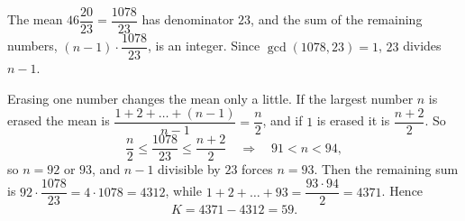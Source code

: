 The mean $46\dfrac{20}{23}=\dfrac{1078}{23}$ has denominator $23$, and the sum of the remaining numbers, $(n-1)\cdot\dfrac{1078}{23}$, is an integer. Since $\gcd(1078,23)=1$, $23$ divides $n-1$.

Erasing one number changes the mean only a little. If the largest number $n$ is erased the mean is $\dfrac{1+2+\dots+(n-1)}{n-1}=\dfrac {n}{2}$, and if $1$ is erased it is $\dfrac{n+2}{2}$. So
\[
\dfrac {n}{2}\le\dfrac{1078}{23}\le\dfrac{n+2}{2}\quad\Longrightarrow\quad 91<n<94,
\]
so $n=92$ or $93$, and $n-1$ divisible by $23$ forces $n=93$. Then the remaining sum is $92\cdot\dfrac{1078}{23}=4\cdot1078=4312$, while $1+2+\dots+93=\dfrac{93\cdot94}{2}=4371$. Hence
\[
K=4371-4312=\boxed{59}.
\]
